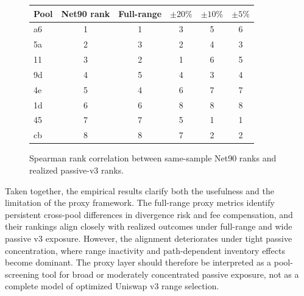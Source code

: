 \documentclass[anonymous]{lipics-v2021}
\begin{document}
{\begin{figure}[t]
\begin{minipage}[t]{0.60\textwidth}
\vspace{0pt}
\centering
\begin{tabular}{lccccc}
\toprule
Pool & Net90 rank & Full-range & $\pm20\%$ & $\pm10\%$ & $\pm5\%$ \\
\midrule
a6 & 1 & 1 & 3 & 5 & 6 \\
5a & 2 & 3 & 2 & 4 & 3 \\
11 & 3 & 2 & 1 & 6 & 5 \\
9d & 4 & 5 & 4 & 3 & 4 \\
4e & 5 & 4 & 6 & 7 & 7 \\
1d & 6 & 6 & 8 & 8 & 8 \\
45 & 7 & 7 & 5 & 1 & 1 \\
cb & 8 & 8 & 7 & 2 & 2 \\
\bottomrule
\end{tabular}
\label{tab:proxy_vs_realized_ranks}
\end{minipage}
\hfill
\begin{minipage}[t]{0.36\textwidth}
\vspace{0pt}
\centering
{}
\caption{Spearman rank correlation between same-sample Net90 ranks and realized passive-v3 ranks.}
\label{fig:concentration_breakdown}
\end{minipage}

\end{figure}

{Taken together, the empirical results clarify both the usefulness and the limitation of the proxy framework. The full-range proxy metrics identify persistent cross-pool differences in divergence risk and fee compensation, and their rankings align closely with realized outcomes under full-range and wide passive v3 exposure. However, the alignment deteriorates under tight passive concentration, where range inactivity and path-dependent inventory effects become dominant. The proxy layer should therefore be interpreted as a pool-screening tool for broad or moderately concentrated passive exposure, not as a complete model of optimized Uniswap v3 range selection.
}


}
\end{document}
